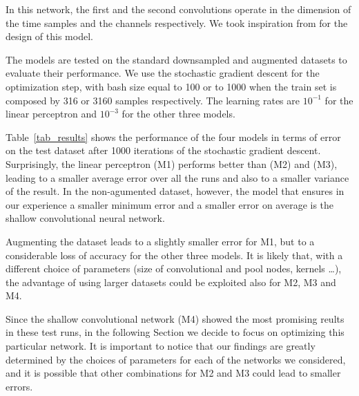 \documentclass{article}
\begin{document}
\begin{itemize}
In this network, the first and the second convolutions operate in the dimension of the time samples and the channels respectively. We took inspiration from \cite{schirrmeister2017deep} for the design of this model.
\end{itemize}
The models are tested on the standard downsampled and augmented datasets to evaluate their performance. We use the stochastic gradient descent for the optimization step, with bash size equal to 100 or to 1000 when the train set is composed by 316 or 3160 samples respectively. The learning rates are $10^{-1}$ for the linear perceptron and $10^{-3}$ for the other three models.

Table~\ref{tab_results} shows the performance of the four models in terms of error on the test dataset after 1000 iterations of the stochastic gradient descent. Surprisingly, the linear perceptron (M1) performs better than (M2) and (M3), leading to a smaller average error over all the runs and also to a smaller variance of the result. In the non-agumented dataset, however, the model that ensures in our experience a smaller minimum error and a smaller error on average is the shallow convolutional neural network.

Augmenting the dataset leads to a slightly smaller error for M1, but to a considerable loss of accuracy for the other three models. It is likely that, with a different choice of parameters (size of convolutional and pool nodes, kernels \ldots), the advantage of using larger datasets could be exploited also for M2, M3 and M4. 

Since the shallow convolutional network (M4) showed the most promising reults in these test runs, in the following Section we decide to focus on optimizing this particular network. It is important to notice that our findings are greatly determined by the choices of parameters for each of the networks we considered, and it is possible that other combinations for M2 and M3 could lead to smaller errors.
\end{document}
